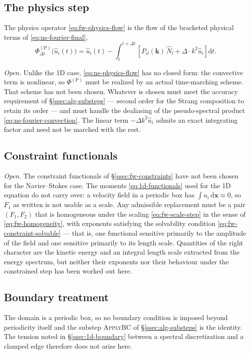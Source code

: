 \subsection{The physics step}\label{ssec:ns-physics-step}

The physics operator \eqref{eq:fw-physics-flow} is the flow of the bracketed
physical terms of \eqref{eq:ns-fourier-final},
\begin{equation}\label{eq:ns-physics-flow}
  \Phi_{\Delta t}^{(\mathrm{P})}\bigl(\hat{u}_i(t)\bigr)
  = \hat{u}_i(t) - \int_{t}^{t+\Delta t}
    \left[ P_{il}(\mathbf{k})\, \hat{N}_l + \Delta \cdot k^2 \hat{u}_i \right] \mathrm{d}t .
\end{equation}

\emph{Open.} Unlike the 1D case, \eqref{eq:ns-physics-flow} has no closed form:
the convective term is nonlinear, so $\Phi^{(\mathrm{P})}$ must be realized by
an actual time-marching scheme. That scheme has not been chosen. Whatever is
chosen must meet the accuracy requirement of \S\ref{ssec:alg-substeps} ---
second order for the Strang composition to retain its order --- and must
handle the dealiasing of the pseudo-spectral product
\eqref{eq:ns-fourier-convection}. The linear term $-\Delta k^2 \hat u_i$ admits
an exact integrating factor and need not be marched with the rest.

\subsection{Constraint functionals}\label{ssec:ns-constraints}

\emph{Open.} The constraint functionals of \S\ref{ssec:fw-constraints} have not
been chosen for the Navier--Stokes case. The moments
\eqref{eq:1d-functionals} used for the 1D equation do not carry over: a
velocity field in a periodic box has $\int u_i\, \mathrm{d}\mathbf{x} \approx 0$,
so $F_1$ as written is not usable as a scale. Any admissible replacement must
be a pair $(F_1, F_2)$ that is homogeneous under the scaling
\eqref{eq:fw-scale-step} in the sense of \eqref{eq:fw-homogeneity}, with
exponents satisfying the solvability condition
\eqref{eq:fw-constraint-solvable} --- that is, one functional sensitive
primarily to the amplitude of the field and one sensitive primarily to its
length scale. Quantities of the right character are the kinetic energy and an
integral length scale extracted from the energy spectrum, but neither their
exponents nor their behaviour under the constrained step has been worked out
here.

\subsection{Boundary treatment}\label{ssec:ns-boundary}

The domain is a periodic box, so no boundary condition is imposed beyond
periodicity itself and the substep \textsc{ApplyBC} of
\S\ref{ssec:alg-substeps} is the identity. The tension noted in
\S\ref{ssec:1d-boundary} between a spectral discretization and a clamped edge
therefore does not arise here.
